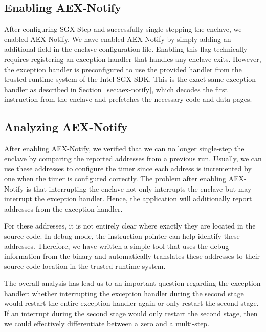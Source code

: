 \documentclass{llncs}
\begin{document}

\subsection{Enabling AEX-Notify}

After configuring SGX-Step and successfully single-stepping the enclave, we
enabled AEX-Notify.
We have enabled AEX-Notify by simply adding an additional field in the enclave
configuration file.
Enabling this flag technically requires registering an exception handler that
handles any enclave exits.
However, the exception handler is preconfigured to use the provided handler
from the trusted runtime system of the Intel SGX SDK.
This is the exact same exception handler as described in
Section~\ref{sec:aex-notify}, which decodes the first instruction from the
enclave and prefetches the necessary code and data pages.

\subsection{Analyzing AEX-Notify}

After enabling AEX-Notify, we verified that we can no longer single-step the
enclave by comparing the reported addresses from a previous run.
Usually, we can use these addresses to configure the timer since each address
is incremented by one when the timer is configured correctly.
The problem after enabling AEX-Notify is that interrupting the enclave not only
interrupts the enclave but may interrupt the exception handler.
Hence, the application will additionally report addresses from the exception
handler.

For these addresses, it is not entirely clear where exactly they are located in
the source code.
In debug mode, the instruction pointer can help identify these addresses.
Therefore, we have written a simple tool that uses the debug information from
the binary and automatically translates these addresses to their source code
location in the trusted runtime system.

The overall analysis has lead us to an important question regarding the
exception handler:
whether interrupting the exception handler during the second stage would
restart the entire exception handler again or only restart the second stage.
If an interrupt during the second stage would only restart the second stage,
then we could effectively differentiate between a zero and a multi-step.
\end{document}
